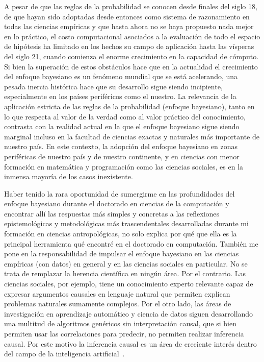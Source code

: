 \documentclass[a4paper,11pt]{book}
\theoremstyle{definition}
\begin{document}

A pesar de que las reglas de la probabilidad se conocen desde finales del siglo 18, de que hayan sido adoptadas desde entonces como sistema de razonamiento en todas las ciencias empíricas y que hasta ahora no se haya propuesto nada mejor en lo práctico, el costo computacional asociados a la evaluación de todo el espacio de hipótesis ha limitado en los hechos su campo de aplicación hasta las vísperas del siglo 21, cuando comienza el enorme crecimiento en la capacidad de cómputo.
%
Si bien la superación de estos obstáculos hace que en la actualidad el crecimiento del enfoque bayesiano es un fenómeno mundial que se está acelerando, una pesada inercia histórica hace que su desarrollo sigue siendo incipiente, especialmente en los países periféricos como el nuestro.
%
La relevancia de la aplicación estricta de las reglas de la probabilidad (enfoque bayesiano), tanto en lo que respecta al valor de la verdad como al valor práctico del conocimiento, contrasta con la realidad actual en la que el enfoque bayesiano sigue siendo marginal incluso en la facultad de ciencias exactas y naturales más importante de nuestro país.
%
En este contexto, la adopción del enfoque bayesiano en zonas periféricas de nuestro país y de nuestro continente, y en ciencias con menor formación en matemática y programación como las ciencias sociales, es en la inmensa mayoría de los casos inexistente.


Haber tenido la rara oportunidad de sumergirme en las profundidades del enfoque bayesiano durante el doctorado en ciencias de la computación y encontrar allí las respuestas más simples y concretas a las reflexiones epistemológicas y metodológicas más trascendentales desarrolladas durante mi formación en ciencias antropológicas, no solo explica por qué que ella es la principal herramienta qué encontré en el doctorado en computación.
%
También me pone en la responsabilidad de impulsar el enfoque bayesiano en las ciencias empíricas (con datos) en general y en las ciencias sociales en particular.
%
No se trata de remplazar la herencia científica en ningún área.
%
Por el contrario.
%
Las ciencias sociales, por ejemplo, tiene un conocimiento experto relevante capaz de expresar argumentos causales en lenguaje natural que permiten explican problemas naturales sumamente complejos.
%
Por el otro lado, las áreas de investigación en aprendizaje automático y ciencia de datos siguen desarrollando una multitud de algoritmos genéricos sin interpretación causal, que si bien permiten usar las correlaciones para predecir, no permiten realizar inferencia causal.
%
Por este motivo la inferencia causal es un área de creciente interés dentro del campo de la inteligencia artificial~\cite{pearl2009-causality, peters2017-causalInference}.
\end{document}
